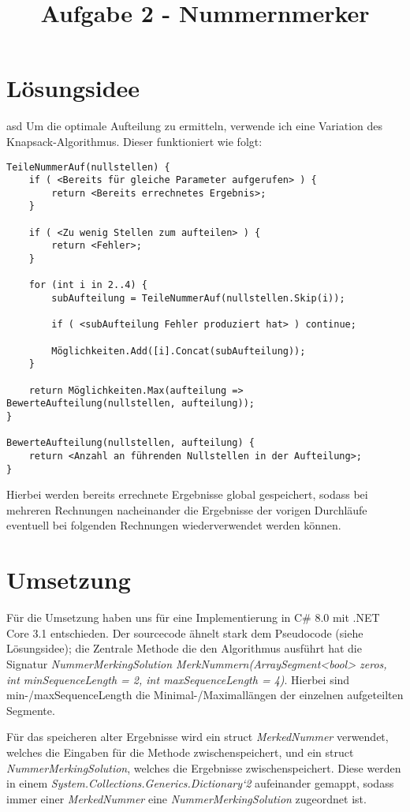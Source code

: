 \documentclass[12pt]{article}
\begin{document}
\title{Aufgabe 2 - Nummernmerker}

\section{Lösungsidee}
asd
Um die optimale Aufteilung zu ermitteln, verwende ich eine Variation des Knapsack-Algorithmus. Dieser funktioniert wie folgt:

\begin{lstlisting}
TeileNummerAuf(nullstellen) {
    if ( <Bereits für gleiche Parameter aufgerufen> ) {
        return <Bereits errechnetes Ergebnis>;
    }
    
    if ( <Zu wenig Stellen zum aufteilen> ) {
    	return <Fehler>;
    }

    for (int i in 2..4) {
        subAufteilung = TeileNummerAuf(nullstellen.Skip(i));

		if ( <subAufteilung Fehler produziert hat> ) continue;
		
        Möglichkeiten.Add([i].Concat(subAufteilung));
    }

    return Möglichkeiten.Max(aufteilung => BewerteAufteilung(nullstellen, aufteilung));
}

BewerteAufteilung(nullstellen, aufteilung) {
    return <Anzahl an führenden Nullstellen in der Aufteilung>;
}
\end{lstlisting}

Hierbei werden bereits errechnete Ergebnisse global gespeichert, sodass bei mehreren Rechnungen nacheinander die Ergebnisse der vorigen Durchläufe eventuell bei folgenden Rechnungen wiederverwendet werden können.

\section{Umsetzung}

Für die Umsetzung haben uns für eine Implementierung in C\# 8.0 mit .NET Core 3.1 entschieden.
Der sourcecode ähnelt stark dem Pseudocode (siehe Lösungsidee); die Zentrale Methode die den Algorithmus ausführt hat die Signatur \textit{NummerMerkingSolution MerkNummern(ArraySegment<bool> zeros, int minSequenceLength = 2, int maxSequenceLength = 4)}. Hierbei sind min-/maxSequenceLength die Minimal-/Maximallängen der einzelnen aufgeteilten Segmente.

Für das speicheren alter Ergebnisse wird ein struct \textit{MerkedNummer} verwendet, welches die Eingaben für die Methode zwischenspeichert, und ein struct \textit{NummerMerkingSolution}, welches die Ergebnisse zwischenspeichert. Diese werden in einem \textit{System.Collections.Generics.Dictionary`2} aufeinander gemappt, sodass immer einer \textit{MerkedNummer} eine \textit{NummerMerkingSolution} zugeordnet ist.
\end{document}
